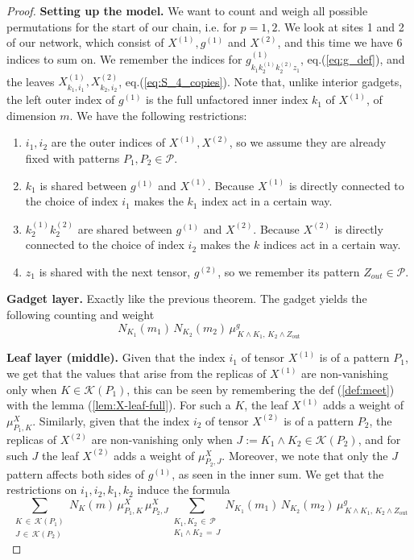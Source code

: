 \documentclass[12pt,a4paper]{article}
\begin{document}
\begin{proof}
\textbf{Setting up the model.} 
We want to count and weigh all possible permutations for the start of our chain, i.e. for $p=1,2$. We look at sites 1 and 2 of our network, which consist of $X^{(1)}, g^{(1)}$ and $X^{(2)}$, and this time we have 6 indices to sum on.
We remember the indices for $g_{k_{1}k_{2}^{(1)}k_{2}^{(2)}z_{1}}^{(1)}$, eq.(\ref{eq:g_def}), and the leaves $X^{(1)}_{k_{1},i_{1}}, X^{(2)}_{k_{2},i_{2}}$, eq.(\ref{eq:S_4_copies}).
Note that, unlike interior gadgets, the left outer index of $g^{(1)}$ is the full unfactored inner index $k_{1}$ of $X^{(1)}$, of dimension $m$.
We have the following restrictions:
\begin{enumerate}
    \item $i_{1}, i_{2}$ are the outer indices of $X^{(1)}, X^{(2)}$, so we assume they are already fixed with patterns $P_{1}, P_{2} \in \mathcal{P}$.
    \item $k_{1}$ is shared between $g^{(1)}$ and $X^{(1)}$. Because $X^{(1)}$ is directly connected to the choice of index $i_{1}$ makes the $k_{1}$ index act in a certain way.
    \item $k_{2}^{(1)}k_{2}^{(2)}$ are shared between $g^{(1)}$ and $X^{(2)}$. Because $X^{(2)}$ is directly connected to the choice of index $i_{2}$ makes the $k$ indices act in a certain way.
    \item $z_{1}$ is shared with the next tensor, $g^{(2)}$, so we remember its pattern $Z_{out}\in\mathcal{P}$.
\end{enumerate}

\smallskip\noindent\textbf{Gadget layer.} 
Exactly like the previous theorem. The gadget yields the following counting and weight $$
N_{K_{1}}(m_{1})\, N_{K_{2}}(m_{2})\,
\mu^{g}_{\,K \wedge K_{1},\, K_{2} \wedge Z_{\mathrm{out}}}$$

\smallskip\noindent\textbf{Leaf layer (middle).} 
Given that the index $i_{1}$ of tensor $X^{(1)}$ is of a pattern $P_{1}$, we get that the values that arise from the replicas of $X^{(1)}$ are non-vanishing only when $K\in\mathcal{K}(P_{1})$, this can be seen by remembering the def (\ref{def:meet}) with the lemma (\ref{lem:X-leaf-full}). For such a $K$, the leaf $X^{(1)}$ adds a weight of $\mu^{X}_{P_{1},K}$.
Similarly, given that the index $i_{2}$ of tensor $X^{(2)}$ is of a pattern $P_{2}$, the replicas of $X^{(2)}$ are non-vanishing only when $J := K_{1} \wedge K_{2} \in \mathcal{K}(P_{2})$, and for such $J$ the leaf $X^{(2)}$ adds a weight of $\mu^{X}_{P_{2},J}$.
Moreover, we note that only the $J$  pattern affects both sides of $g^{(1)}$, as seen in the inner sum.
We get that the restrictions on $i_{1},i_{2},k_{1},k_{2}$ induce the formula $$\!\!\!\!\!\sum_{\substack{K \,\in\, \mathcal{K}(P_{1}) \\ J \,\in\, \mathcal{K}(P_{2})}}\!\!\!\!\!
N_{K}(m)\, \mu^{X}_{P_{1}, K}\, \mu^{X}_{P_{2}, J}
\!\!\!\!\!\sum_{\substack{K_{1}, K_{2} \,\in\, \mathcal{P} \\ K_{1} \wedge K_{2} \,=\, J}}\!\!\!\!\!
N_{K_{1}}(m_{1})\, N_{K_{2}}(m_{2})\,
\mu^{g}_{\,K \wedge K_{1},\, K_{2} \wedge Z_{\mathrm{out}}}$$


\end{proof}
\end{document}

